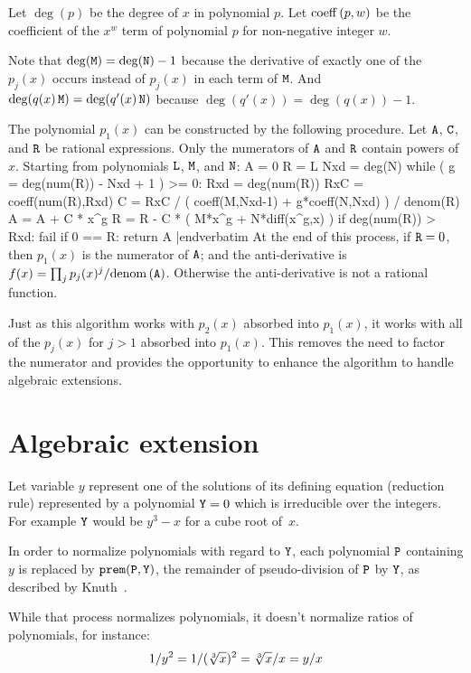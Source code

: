 Let $\deg(p)$ be the degree of $x$ in polynomial $p$.  Let
${\rm coeff}\,(p,w)$ be the coefficient of the $x^w$ term of polynomial $p$
for non-negative integer $w$.

Note that $\deg({\tt{M}})=\deg({\tt{N}})-1$ because the
derivative of exactly one of the $p_j(x)$ occurs instead of $p_j(x)$
in each term of ${\tt{M}}$.  And
$\deg(q(x)\,{\tt{M}})=\deg(q'(x)\,{\tt{N}})$ because
$\deg(q'(x))=\deg(q(x))-1$.

The polynomial $p_1(x)$ can be constructed by the following procedure.
Let ${\tt{A}}$, ${\tt{C}}$, and ${\tt{R}}$ be rational expressions.
Only the numerators of ${\tt{A}}$ and ${\tt{R}}$ contain powers of
$x$.  Starting from polynomials ${\tt{L}}$, ${\tt{M}}$, and
${\tt{N}}$:
\medskip
\verbatim
A = 0
R = L
Nxd = deg(N)
while ( g = deg(num(R)) - Nxd + 1 ) >= 0:
    Rxd = deg(num(R))
    RxC = coeff(num(R),Rxd)
    C = RxC / ( coeff(M,Nxd-1) + g*coeff(N,Nxd) ) / denom(R)
    A = A + C * x^g
    R = R - C * ( M*x^g + N*diff(x^g,x) )
    if deg(num(R)) > Rxd:
        fail
    if 0 == R:
        return A
|endverbatim
\medskip
At the end of this process, if ${\tt{R}}=0$, then $p_1(x)$ is the
numerator of ${\tt{A}}$; and the anti-derivative is
$f(x)=\prod_j{p_j(x)^j}/{\rm denom}\,({\tt{A}})$.  Otherwise the
anti-derivative is not a rational function.

\medskip
Just as this algorithm works with $p_2(x)$ absorbed into $p_1(x)$, it
works with all of the $p_j(x)$ for $j>1$ absorbed into $p_1(x)$.  This
removes the need to factor the numerator and provides the opportunity
to enhance the algorithm to handle algebraic extensions.

\section{Algebraic extension}

Let variable $y$ represent one of the solutions of its defining
equation (reduction rule) represented by a polynomial ${\tt{Y}}=0$
which is irreducible over the integers.  For example ${\tt{Y}}$ would
be $y^3-x$ for a cube root of~$x$.

In order to normalize polynomials with regard to ${\tt{Y}}$, each
polynomial ${\tt{P}}$ containing $y$ is replaced by
${\tt{prem(P,Y)}}$, the remainder of pseudo-division of ${\tt{P}}$ by
${\tt{Y}}$, as described by Knuth~\cite{KnuthVol2}.

While that process normalizes polynomials, it doesn't normalize
ratios of polynomials, for instance:
$$1/y^2=1/(\root3\of{x})^2=\root3\of{x}/x=y/x$$

